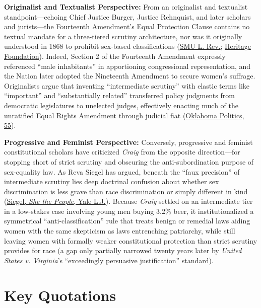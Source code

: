 \documentclass[12pt]{article}
\begin{document}
\textbf{Originalist and Textualist Perspective:} From an originalist and textualist standpoint---echoing Chief Justice Burger, Justice Rehnquist, and later scholars and jurists---the Fourteenth Amendment's Equal Protection Clause contains no textual mandate for a three-tiered scrutiny architecture, nor was it originally understood in 1868 to prohibit sex-based classifications (\href{https://scholar.smu.edu/cgi/viewcontent.cgi?article=4964&context=smulr}{SMU L. Rev.}; \href{https://www.heritage.org/the-constitution/report/originalism-and-conservatism-american-story}{Heritage Foundation}). Indeed, Section 2 of the Fourteenth Amendment expressly referenced ``male inhabitants'' in apportioning congressional representation, and the Nation later adopted the Nineteenth Amendment to secure women's suffrage. Originalists argue that inventing ``intermediate scrutiny'' with elastic terms like ``important'' and ``substantially related'' transferred policy judgments from democratic legislatures to unelected judges, effectively enacting much of the unratified Equal Rights Amendment through judicial fiat (\href{https://ojs.library.okstate.edu/osu/index.php/OKPolitics/article/view/930/832}{Oklahoma Politics, 55}).

\textbf{Progressive and Feminist Perspective:} Conversely, progressive and feminist constitutional scholars have criticized \textit{Craig} from the opposite direction---for stopping short of strict scrutiny and obscuring the anti-subordination purpose of sex-equality law. As Reva Siegel has argued, beneath the ``faux precision'' of intermediate scrutiny lies deep doctrinal confusion about whether sex discrimination is less grave than race discrimination or simply different in kind (\href{https://law.yale.edu/sites/default/files/documents/pdf/Faculty/Siegel_SheThePeople.pdf}{Siegel, \textit{She the People}, Yale L.J.}). Because \textit{Craig} settled on an intermediate tier in a low-stakes case involving young men buying 3.2\% beer, it institutionalized a symmetrical ``anti-classification'' rule that treats benign or remedial laws aiding women with the same skepticism as laws entrenching patriarchy, while still leaving women with formally weaker constitutional protection than strict scrutiny provides for race (a gap only partially narrowed twenty years later by \textit{United States v. Virginia}'s ``exceedingly persuasive justification'' standard).

\section{Key Quotations}
\end{document}
